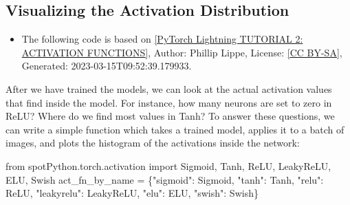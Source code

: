 \documentclass[
  letterpaper,
  DIV=11,
  numbers=noendperiod]{scrreprt}
\newenvironment{Shaded}{\begin{snugshade}}{\end{snugshade}}
\newcommand{\ImportTok}[1]{\textcolor[rgb]{0.00,0.46,0.62}{#1}}
\newcommand{\NormalTok}[1]{\textcolor[rgb]{0.00,0.23,0.31}{#1}}
\newcommand{\OperatorTok}[1]{\textcolor[rgb]{0.37,0.37,0.37}{#1}}
\newcommand{\StringTok}[1]{\textcolor[rgb]{0.13,0.47,0.30}{#1}}
\providecommand{\tightlist}{%
  \setlength{\itemsep}{0pt}\setlength{\parskip}{0pt}}\usepackage{longtable,booktabs,array}
\begin{document}
\hypertarget{visualizing-the-activation-distribution}{%
\subsection{Visualizing the Activation
Distribution}\label{visualizing-the-activation-distribution}}

\begin{tcolorbox}[enhanced jigsaw, left=2mm, title=\textcolor{quarto-callout-note-color}{\faInfo}\hspace{0.5em}{Reference:}, titlerule=0mm, toprule=.15mm, leftrule=.75mm, colbacktitle=quarto-callout-note-color!10!white, colback=white, arc=.35mm, toptitle=1mm, bottomtitle=1mm, colframe=quarto-callout-note-color-frame, bottomrule=.15mm, rightrule=.15mm, breakable, coltitle=black, opacitybacktitle=0.6, opacityback=0]

\begin{itemize}
\tightlist
\item
  The following code is based on
  \href{https://lightning.ai/docs/pytorch/stable/notebooks/course_UvA-DL/02-activation-functions.html}{{[}PyTorch
  Lightning TUTORIAL 2: ACTIVATION FUNCTIONS{]}}, Author: Phillip Lippe,
  License: \href{https://creativecommons.org/licenses/by-sa/3.0/}{{[}CC
  BY-SA{]}}, Generated: 2023-03-15T09:52:39.179933.
\end{itemize}

\end{tcolorbox}

After we have trained the models, we can look at the actual activation
values that find inside the model. For instance, how many neurons are
set to zero in ReLU? Where do we find most values in Tanh? To answer
these questions, we can write a simple function which takes a trained
model, applies it to a batch of images, and plots the histogram of the
activations inside the network:

\begin{Shaded}
\begin{Highlighting}[]
\ImportTok{from}\NormalTok{ spotPython.torch.activation }\ImportTok{import}\NormalTok{ Sigmoid, Tanh, ReLU, LeakyReLU, ELU, Swish}
\NormalTok{act\_fn\_by\_name }\OperatorTok{=}\NormalTok{ \{}\StringTok{"sigmoid"}\NormalTok{: Sigmoid, }\StringTok{"tanh"}\NormalTok{: Tanh, }\StringTok{"relu"}\NormalTok{: ReLU, }\StringTok{"leakyrelu"}\NormalTok{: LeakyReLU, }\StringTok{"elu"}\NormalTok{: ELU, }\StringTok{"swish"}\NormalTok{: Swish\}}
\end{Highlighting}
\end{Shaded}
\end{document}

